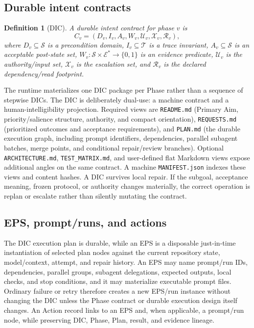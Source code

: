 \documentclass[11pt]{article}
\newtheorem{definition}{Definition}[section]
\newcommand{\State}{\mathcal S}
\newcommand{\Trace}{\mathcal T}
\newcommand{\Evidence}{\mathcal E}
\begin{document}
\subsection{Durable intent contracts}
\begin{definition}[DIC]
A durable intent contract for phase $v$ is
\[
C_v=(D_v,I_v,A_v,W_v,\mathcal U_v,\mathcal X_v,\mathcal R_v),
\]
where $D_v\subseteq\State$ is a precondition domain, $I_v\subseteq\Trace$ is a trace invariant, $A_v\subseteq\State$ is an acceptable post-state set, $W_v:\State\times\Evidence^*\to\{0,1\}$ is an evidence predicate, $\mathcal U_v$ is the authority/input set, $\mathcal X_v$ is the escalation set, and $\mathcal R_v$ is the declared dependency/read footprint.
\end{definition}
The runtime materializes one DIC package per Phase rather than a sequence of stepwise DICs. The DIC is deliberately dual-use: a machine contract and a human-intelligibility projection. Required views are \texttt{README.md} (Primary Aim, priority/salience structure, authority, and compact orientation), \texttt{REQUESTS.md} (prioritized outcomes and acceptance requirements), and \texttt{PLAN.md} (the durable execution graph, including prompt identifiers, dependencies, parallel subagent batches, merge points, and conditional repair/review branches). Optional \texttt{ARCHITECTURE.md}, \texttt{TEST\_MATRIX.md}, and user-defined flat Markdown views expose additional angles on the same contract. A machine \texttt{MANIFEST.json} indexes these views and content hashes. A DIC survives local repair. If the subgoal, acceptance meaning, frozen protocol, or authority changes materially, the correct operation is replan or escalate rather than silently mutating the contract.

\subsection{EPS, prompt/runs, and actions}
The DIC execution plan is durable, while an EPS is a disposable just-in-time instantiation of selected plan nodes against the current repository state, model/context, attempt, and repair history. An EPS may name prompt/run IDs, dependencies, parallel groups, subagent delegations, expected outputs, local checks, and stop conditions, and it may materialize executable prompt files. Ordinary failure or retry therefore creates a new EPS/run instance without changing the DIC unless the Phase contract or durable execution design itself changes. An Action record links to an EPS and, when applicable, a prompt/run node, while preserving DIC, Phase, Plan, result, and evidence lineage.
\end{document}
